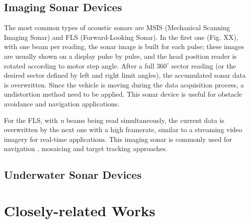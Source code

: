 \documentclass[final,5p,times]{elsarticle}
\begin{document}
\subsection{Imaging Sonar Devices}

The most common types of acoustic sonars are MSIS (Mechanical Scanning Imaging Sonar) and FLS (Forward-Looking Sonar). In the first one (Fig. XX), with one beam per reading, the sonar image is built for each pulse; these images are usually shown on a display pulse by pulse, and the head position reader is rotated according to motor step angle. After a full $360^{\circ}$ sector reading (or the desired sector defined by left and right limit angles), the accumulated sonar data is overwritten. Since the vehicle is moving during the data acquisition process, a undistortion method need to be applied. This sonar device is useful for obstacle avoidance \cite{ganesan2015} and navigation \cite{ribas2010} applications.

For the FLS, with \textit{n} beams being read simultaneously, the current data is overwritten by the next one with a high framerate, similar to a streaming video imagery for real-time applications. This imaging sonar is commonly used for navigation \cite{fallon2013}, mosaicing \cite{hurtos2014a} and target tracking \cite{liu2016} approaches.
%


%
%
%

%

\subsection{Underwater Sonar Devices}
\label{}


\section{Closely-related Works}
\label{}
\end{document}
